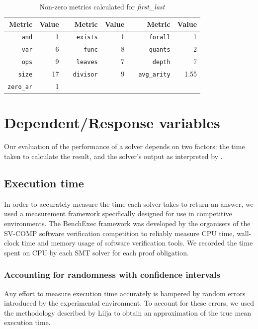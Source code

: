 \begin{table}
	\centering
	\caption{Non-zero metrics calculated for \textit{first\_last}} 
	\label{table:examplemetrics}
	\begin{tabular}
		{|r|r|c|r|r|c|r|r|} \hline
		Metric&Value&&Metric&Value&&Metric&Value \\ \hline
		\texttt{and}&1&&\texttt{exists}&1&&\texttt{forall}&1 \\ \hline
		\texttt{var}&6&&\texttt{func}&8&&\texttt{quants}&2 \\ \hline
		\texttt{ops}&9&&\texttt{leaves}&7&&\texttt{depth}&7 \\ \hline
		\texttt{size}&17&&\texttt{divisor}&9&& \texttt{avg\_arity}&1.55 \\ 
		\hline
		\texttt{zero\_ar}&1&& & && & \\ \hline	
	\end{tabular}
\end{table}


\section{Dependent/Response variables}
\label{sec:dependant}

Our evaluation of the performance of a solver depends on two factors: the time taken to calculate the result, and the solver's output as interpreted by \why.

\subsection{Execution time}
In order to accurately measure the time each solver takes to return an answer, we used a measurement framework specifically designed for use in competitive environments. 
The BenchExec \cite{ Beyer2016,benchexec} framework was developed by the organisers of the SV-COMP \cite{SVCOMP} software verification competition to reliably measure CPU time, wall-clock time and memory usage of software verification tools. 
We recorded the time spent on CPU by each SMT solver for each proof obligation. 

\subsubsection{Accounting for randomness with confidence intervals}
\label{sub:confidence}

Any effort to measure execution time accurately is hampered by random errors introduced by the experimental environment.
To account for these errors, we used the methodology described by Lilja \cite{LiljaJ} to obtain an approximation of the true mean execution time. 

